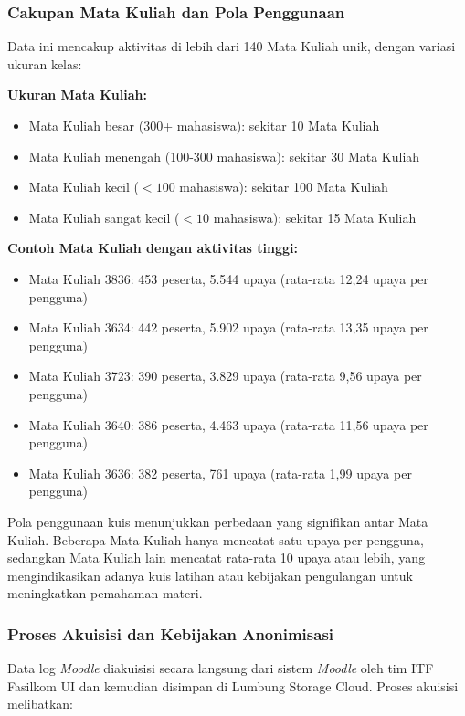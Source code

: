 \subsubsection{Cakupan Mata Kuliah dan Pola Penggunaan}
\label{sec:cakupanMataKuliahPolaPenggunaan}
Data ini mencakup aktivitas di lebih dari 140 Mata Kuliah unik, dengan variasi ukuran kelas:

\textbf{Ukuran Mata Kuliah:}
\begin{itemize}
    \item Mata Kuliah besar (300+ mahasiswa): sekitar 10 Mata Kuliah
    \item Mata Kuliah menengah (100-300 mahasiswa): sekitar 30 Mata Kuliah
    \item Mata Kuliah kecil ($<100$ mahasiswa): sekitar 100 Mata Kuliah
    \item Mata Kuliah sangat kecil ($<10$ mahasiswa): sekitar 15 Mata Kuliah
\end{itemize}

\textbf{Contoh Mata Kuliah dengan aktivitas tinggi:}
\begin{itemize}
    \item Mata Kuliah 3836: 453 peserta, 5.544 upaya (rata-rata 12,24 upaya per pengguna)
    \item Mata Kuliah 3634: 442 peserta, 5.902 upaya (rata-rata 13,35 upaya per pengguna)
    \item Mata Kuliah 3723: 390 peserta, 3.829 upaya (rata-rata 9,56 upaya per pengguna)
    \item Mata Kuliah 3640: 386 peserta, 4.463 upaya (rata-rata 11,56 upaya per pengguna)
    \item Mata Kuliah 3636: 382 peserta, 761 upaya (rata-rata 1,99 upaya per pengguna)
\end{itemize}

Pola penggunaan kuis menunjukkan perbedaan yang signifikan antar Mata Kuliah. Beberapa Mata Kuliah hanya mencatat satu upaya per pengguna, sedangkan Mata Kuliah lain mencatat rata-rata 10 upaya atau lebih, yang mengindikasikan adanya kuis latihan atau kebijakan pengulangan untuk meningkatkan pemahaman materi.

\subsubsection{Proses Akuisisi dan Kebijakan Anonimisasi}
\label{sec:prosesAkuisisiKebijakanAnonimisasi}
Data log \textit{Moodle} diakuisisi secara langsung dari sistem \textit{Moodle} oleh tim ITF Fasilkom UI dan kemudian disimpan di Lumbung Storage Cloud. Proses akuisisi melibatkan:

